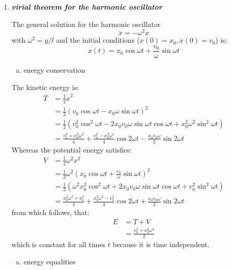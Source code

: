 \documentclass[a4paper,12pt]{article}
\newcommand{\question}[1]{\textbf{\textit{#1}}}
\begin{document}
\begin{enumerate}
		\newpage
		
		\setcounter{equation}{0}
		\item \question{virial theorem for the harmonic oscillator}
		
		The general solution for the harmonic oscillator
		\begin{equation}
		\ddot{x}=-\omega^2x
		\end{equation}
		with \(\omega^2=g/l\) and the initial conditions (\(x(0)=x_0, \dot{x}(0)=v_0\)) is:
		\begin{equation}
		x(t)=x_0\cos\omega t+\frac{v_0}{\omega}\sin\omega t
		\end{equation}
		
		\begin{enumerate}[(a)]
			\item energy conservation
		\end{enumerate}
		
		The kinetic energy is:
		\begin{align}
		T&=\frac{1}{2}\dot{x}^2\\
		&=\frac{1}{2}\left(v_0\cos\omega t-x_0\omega\sin\omega t\right)^2\\
		&=\frac{1}{2}\left(v_0^2\cos^2\omega t-2x_0v_0\omega\sin\omega t\cos\omega t+x_0^2\omega^2\sin^2\omega t\right)\\
		&=\frac{v_0^2+x_0^2\omega^2}{4}+\frac{v_0^2-x_0^2\omega^2}{4}\cos 2\omega t-\frac{x_0v_0\omega}{2}\sin2\omega t
		\end{align}
		Whereas the potential energy satisfies:
		\begin{align}
		V&=\frac{1}{2}\omega^2x^2\\
		&=\frac{1}{2}\omega^2\left(x_0\cos\omega t+\frac{v_0}{\omega}\sin\omega t\right)^2\\
		&=\frac{1}{2}\left(\omega^2x_0^2\cos^2\omega t+2x_0v_0\omega\sin\omega t\cos\omega t+v_0^2\sin^2\omega t\right)\\
		&=\frac{x_0^2\omega^2+v_0^2}{4}+\frac{x_0^2\omega^2-v_0^2}{4}\cos 2\omega t+\frac{x_0v_0\omega}{2}\sin2\omega t
		\end{align}
		from which follows, that:
		\begin{align}
		E&=T+V\\
		&=\frac{v_0^2+x_0^2\omega^2}{2}
		\end{align}
		which is constant for all times \(t\) because it is time independent.
		
		\begin{enumerate}[(b)]
			\item energy equalities
		\end{enumerate}
		

\end{enumerate}
\end{document}
